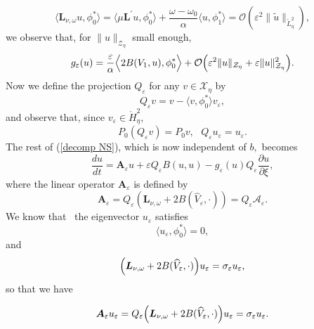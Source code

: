 \documentclass[11pt]{article}
\begin{document}
\begin{equation*}
\langle \boldsymbol{L}_{\nu ,\omega }u,\phi _{0}^{\ast }\rangle =\langle \mu 
\boldsymbol{L}^{\prime }u,\phi _{0}^{\ast }\rangle +\frac{\omega -\omega _{0}%
}{\alpha }\langle u,\phi _{1}^{\ast }\rangle =\mathcal{O}(\varepsilon ^{2}\|%
\widetilde{u}\|_{\mathring{L}_{\eta}^{2}}),
\end{equation*}%
we observe that, for $\|u\|_{\mathcal{Z}_{\eta}}$ small enough, 
\begin{equation*}
g_{\varepsilon }(u)=\frac{\varepsilon }{\alpha } \Bigl\langle 2B(V_{1},u),\phi
_{0}^{\ast } \Bigr\rangle +\mathcal{O} \Bigl(\varepsilon ^{2}\|u\|_{\mathcal{Z}%
_{\eta}}+\varepsilon \|u\|_{\mathcal{Z}_{\eta}}^{2} \Bigr).
\end{equation*}%
Now we define the projection $Q_{\varepsilon }$ for any $v\in \mathcal{X}_{\eta}$ by
\begin{equation*}
Q_{\varepsilon }v=v-\langle v,\phi _{0}^{\ast }\rangle v_{\varepsilon },
\end{equation*}%
and observe that, since $v_{\varepsilon }\in \mathring{H}_{\eta}^{2},$ 
\begin{equation*}
P_{0}(Q_{\varepsilon }v)=P_{0}v,\text{ }Q_{\varepsilon }u_{\varepsilon
}=u_{\varepsilon }.
\end{equation*}%
The rest of (\ref{decomp NS}), which is now independent of $b,$ becomes
\begin{equation}
\frac{du}{dt}=\boldsymbol{A}_{\varepsilon }u+\varepsilon Q_{\varepsilon
}B(u,u)-g_{\varepsilon }(u)Q_{\varepsilon }\frac{\partial u}{\partial \xi },
\label{proj NS}
\end{equation}%
where the linear operator $\boldsymbol{A}_{\varepsilon }$ is defined by 
\begin{equation*}
\boldsymbol{A}_{\varepsilon }=Q_{\varepsilon }(\boldsymbol{L}_{\nu ,\omega
}+2B(\widehat{V}_{\varepsilon },\cdot ))=Q_{\varepsilon }\mathcal{A}_\varepsilon.
\end{equation*}%
We know that \ the eigenvector $u_{\varepsilon }$ satisfies%
\begin{equation*}
\langle u_{\varepsilon },\phi _{0}^{\ast }\rangle =0,
\end{equation*}%
and 
\begin{equation*}
\Bigl( \boldsymbol{L}_{\nu ,\omega }+2B(\widehat{V}_{\varepsilon },\cdot
) \Bigr) u_{\varepsilon }=\sigma _{\varepsilon }u_{\varepsilon },
\end{equation*}%
so that we have

\begin{equation*}
\boldsymbol{A}_{\varepsilon }u_{\varepsilon }=Q_{\varepsilon } \Bigl( \boldsymbol{L}%
_{\nu ,\omega }+2B(\widehat{V}_{\varepsilon },\cdot ) \Bigr) u_{\varepsilon
}=\sigma _{\varepsilon }u_{\varepsilon }.
\end{equation*}
\end{document}
